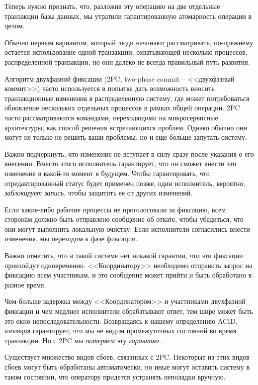 \documentclass[%
	11pt,
	a4paper,
	utf8,
		]{article}
\begin{document}
Теперь нужно признать, что, разложив эту операцию на две отдельные транзакции базы данных, мы утратили гарантированную атомарность операции в целом. 

Обычно первым вариантом, который люди начинают рассматривать, по-прежнему остается использование одной транзакции, охватывающей несколько процессов, -- распределенной транзакции, но они далеко не всегда правильный путь развития.

Алгоритм двухфазной фиксации (2PC, two-phase commit -- <<двухфазный коммит>>) часто используется в попытке дать возможность вносить транзакционные изменения в распределенную систему, где может потребоваться обновление нескольких отдельных процессов в рамках общей операции. 2PC часто рассматриваются командами, переходящими на микросервисные архитектуры, как способ решения встречающихся проблем. Однако обычно они могут не только не решить ваши проблемы, но и еще больше запутать систему.

Важно подчеркнуть, что изменение не вступает в силу сразу после указания о его внесении. Вместо этого исполнитель гарантирует, что он сможет внести это изменение в какой-то момент в будущем. Чтобы гарантировать, что отредактированный статус будет применен позже, один исполнитель, вероятно, \emph{заблокирует запись}, чтобы защитить ее от других изменений.

Если какие-либо рабочие процессы не проголосовали за фиксацию, всем сторонам должно быть отправлено сообщение об откате, чтобы убедиться, что они могут выполнить локальную очистку. Если исполнители согласились внести изменения, мы переходим к фазе фиксации.

Важно отметить, что в такой системе нет никакой гарантии, что эти фиксации произойдут одновременно. <<Координатору>> необходимо отправить запрос на фиксацию всем участникам, и это сообщение может прийти и быть обработано в разное время.

Чем больше задержка между <<Координатором>> и участниками двухфазной фиксации и чем медлнее исполнители обрабатывают ответ, тем шире может быть это окно непоследовательности. Возвращаясь к нашему определению ACID, \emph{изоляция} гарантирует, что мы не видим промежуточных состояний во время транзакции. Но с 2PC мы \emph{\color{red}потеряем} эту \emph{гарантию} \cite[]{microservices-2024}.

Существует множество видов сбоев, связанных с 2PC. Некоторые из этих видов сбоев могут быть обработаны автоматически, но иные могут оставить систему в таком состоянии, что оператору придется устранять неполадки вручную.
\end{document}
